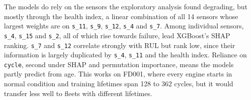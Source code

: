 The models do rely on the sensors the exploratory analysis found
degrading, but mostly through the health index, a linear combination of
all 14 sensors whose largest weights are on \texttt{s\_11}, \texttt{s\_9},
\texttt{s\_12}, \texttt{s\_4} and \texttt{s\_7}. Among individual sensors,
\texttt{s\_4}, \texttt{s\_15} and \texttt{s\_2}, all of which rise
towards failure, lead XGBoost's SHAP ranking. \texttt{s\_7} and
\texttt{s\_12} correlate strongly with RUL but rank low, since their
information is largely duplicated by \texttt{s\_4}, \texttt{s\_11} and the
health index. Reliance on \texttt{cycle}, second under SHAP and permutation
importance, means the models partly predict from age. This works on
FD001, where every engine starts in normal condition and training
lifetimes span 128 to 362 cycles, but it would transfer less well to
fleets with different lifetimes.
